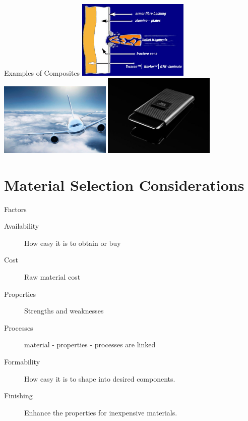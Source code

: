 \documentclass[10pt, svgnames]{beamer}
\begin{document}
\begin{frame}[label={sec:org65568a2}]{Examples of Composites}
\centering
\includegraphics[width=0.4\textwidth]{pictures/composite-armor}
\includegraphics[width=0.4\textwidth]{pictures/application-aerospace1}
\includegraphics[width=0.4\textwidth]{pictures/cfrp-case}
\end{frame}

\section{Material Selection Considerations}
\label{sec:org54d714a}

\begin{frame}[label={sec:org82fa46e}]{Factors}
\begin{description}
\item[{Availability}] How easy it is to obtain or buy
\item[{Cost}] Raw material cost
\item[{Properties}] Strengths and weaknesses
\item[{Processes}] material - properties - processes are linked
\item[{Formability}] How easy it is to shape into desired components.
\item[{Finishing}] Enhance the properties for inexpensive materials.
\end{description}
\end{frame}
\end{document}
